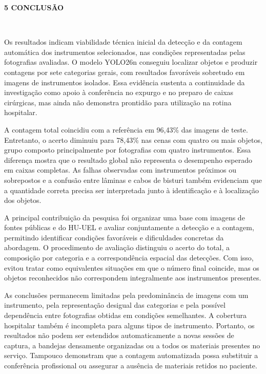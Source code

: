 \begingroup
\justifying
\setlength{\parindent}{1.25cm}
\setlength{\parskip}{0pt}
\setlength{\emergencystretch}{2em}
\onehalfspacing
\renewcommand{\tablename}{Tabela}

{}
\noindent\textbf{5 CONCLUSÃO}\par
\nobreak\vspace{\baselineskip}\nobreak

~~

Os resultados indicam viabilidade técnica inicial da detecção e da contagem automática dos instrumentos selecionados, nas condições representadas pelas fotografias avaliadas. O modelo YOLO26n conseguiu localizar objetos e produzir contagens por sete categorias gerais, com resultados favoráveis sobretudo em imagens de instrumentos isolados. Essa evidência sustenta a continuidade da investigação como apoio à conferência no expurgo e no preparo de caixas cirúrgicas, mas ainda não demonstra prontidão para utilização na rotina hospitalar.

A contagem total coincidiu com a referência em 96,43\% das imagens de teste. Entretanto, o acerto diminuiu para 78,43\% nas cenas com quatro ou mais objetos, grupo composto principalmente por fotografias com quatro instrumentos. Essa diferença mostra que o resultado global não representa o desempenho esperado em caixas completas. As falhas observadas com instrumentos próximos ou sobrepostos e a confusão entre lâminas e cabos de bisturi também evidenciam que a quantidade correta precisa ser interpretada junto à identificação e à localização dos objetos.

A principal contribuição da pesquisa foi organizar uma base com imagens de fontes públicas e do HU-UEL e avaliar conjuntamente a detecção e a contagem, permitindo identificar condições favoráveis e dificuldades concretas da abordagem. O procedimento de avaliação distinguiu o acerto do total, a composição por categoria e a correspondência espacial das detecções. Com isso, evitou tratar como equivalentes situações em que o número final coincide, mas os objetos reconhecidos não correspondem integralmente aos instrumentos presentes.

As conclusões permanecem limitadas pela predominância de imagens com um instrumento, pela representação desigual das categorias e pela possível dependência entre fotografias obtidas em condições semelhantes. A cobertura hospitalar também é incompleta para alguns tipos de instrumento. Portanto, os resultados não podem ser estendidos automaticamente a novas sessões de captura, a bandejas densamente organizadas ou a todos os materiais presentes no serviço. Tampouco demonstram que a contagem automatizada possa substituir a conferência profissional ou assegurar a ausência de materiais retidos no paciente.

